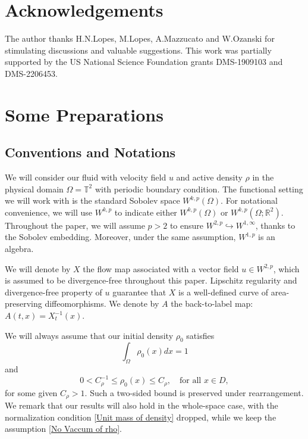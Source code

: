 \documentclass[12pt,letterpaper]{article}
\theoremstyle{plain}
\begin{document}
\section*{Acknowledgements} The author thanks H.N.Lopes, M.Lopes, A.Mazzucato and W.Ozanski for stimulating discussions and valuable suggestions. This work was partially supported by the US National Science Foundation grants DMS-1909103 and DMS-2206453.


\section{Some Preparations}

\subsection{Conventions and Notations}

We will consider our fluid with velocity field $u$ and active density $\rho$ in the physical domain $\Omega=\mathbb T^2$ with periodic boundary condition.  The functional setting we will work with is the standard Sobolev space $W^{k,p}(\Omega)$. For notational convenience, we will use $W^{k,p}$ to indicate either $W^{k,p}(\Omega)$ or $W^{k,p}(\Omega;\mathbb R^2)$. Throughout the paper, we will assume $p>2$ to ensure $W^{2,p}\hookrightarrow W^{1,\infty}$, thanks to the Sobolev embedding. Moreover, under the same assumption, $W^{1,p}$ is an algebra.

We will denote by $X$ the flow map associated with a vector field $u\in W^{2,p}$, which is assumed to be divergence-free throughout this paper. Lipschitz regularity and divergence-free property of $u$ guarantee that $X$ is a well-defined curve of area-preserving diffeomorphisms. We denote by $A$ the back-to-label map: $A(t,x)=X_t^{-1}(x)$. 

We will always assume that our initial density $\rho_0$ satisfies
\begin{equation}\label{Unit mass of density}
 \int_\Omega \rho_0(x)dx=1   
\end{equation}
and
\begin{equation}\label{No Vaccum of rho}
  0< C_\rho^{-1}\le \rho_0(x)\le C_\rho ,\quad \text{for all }x\in D, 
\end{equation}
for some given $C_\rho>1$. Such a two-sided bound is preserved under rearrangement. We remark that our results will also hold in the whole-space case, with the normalization condition \eqref{Unit mass of density} dropped, while we keep the assumption \eqref{No Vaccum of rho}.
\end{document}

